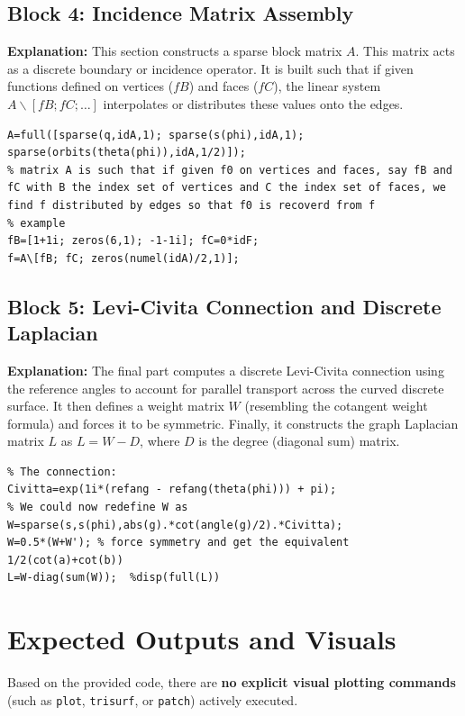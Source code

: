 \subsection*{Block 4: Incidence Matrix Assembly}
\textbf{Explanation:} This section constructs a sparse block matrix $A$. This matrix acts as a discrete boundary or incidence operator. It is built such that if given functions defined on vertices ($fB$) and faces ($fC$), the linear system $A \backslash [fB; fC; \dots]$ interpolates or distributes these values onto the edges. 
\begin{lstlisting}
A=full([sparse(q,idA,1); sparse(s(phi),idA,1); sparse(orbits(theta(phi)),idA,1/2)]);
% matrix A is such that if given f0 on vertices and faces, say fB and fC with B the index set of vertices and C the index set of faces, we find f distributed by edges so that f0 is recoverd from f
% example 
fB=[1+1i; zeros(6,1); -1-1i]; fC=0*idF;
f=A\[fB; fC; zeros(numel(idA)/2,1)];
\end{lstlisting}

\subsection*{Block 5:   Levi-Civita Connection and Discrete Laplacian}
\textbf{Explanation:} The final part computes a discrete Levi-Civita connection using the reference angles to account for parallel transport across the curved discrete surface. It then defines a weight matrix $W$ (resembling the cotangent weight formula) and forces it to be symmetric. Finally, it constructs the graph Laplacian matrix $L$ as $L = W - D$, where $D$ is the degree (diagonal sum) matrix.
\begin{lstlisting}
% The connection:
Civitta=exp(1i*(refang - refang(theta(phi))) + pi);
% We could now redefine W as
W=sparse(s,s(phi),abs(g).*cot(angle(g)/2).*Civitta);
W=0.5*(W+W'); % force symmetry and get the equivalent 1/2(cot(a)+cot(b))
L=W-diag(sum(W));  %disp(full(L))
\end{lstlisting}

\section*{Expected Outputs and Visuals}

Based on the provided code, there are \textbf{no explicit visual plotting commands} (such as \texttt{plot}, \texttt{trisurf}, or \texttt{patch}) actively executed. 

